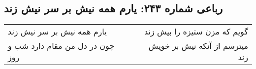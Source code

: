 \begin{center}
\section*{رباعی شماره ۲۴۳: یارم همه نیش بر سر نیش زند}
\label{sec:sh243}
\begin{longtable}{l p{0.5cm} r}
یارم همه نیش بر سر نیش زند
&&
گویم که مزن ستیزه را بیش زند
\\
چون در دل من مقام دارد شب و روز
&&
میترسم از آنکه نیش بر خویش زند
\\
\end{longtable}
\end{center}
